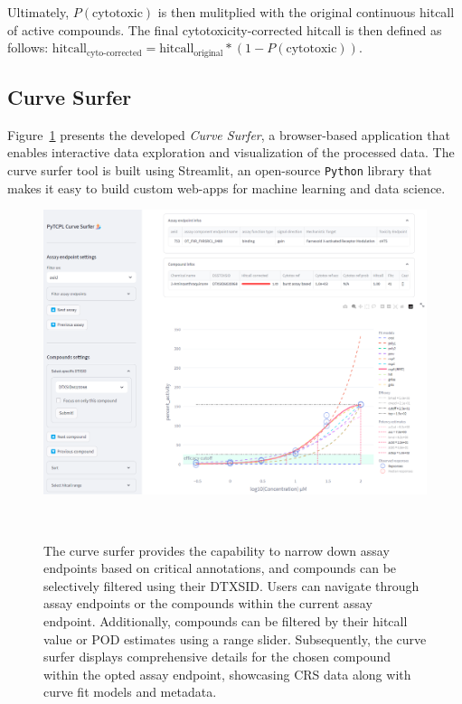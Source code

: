 Ultimately, $P(\text{cytotoxic})$ is then mulitplied with the original continuous hitcall of active compounds. The final cytotoxicity-corrected hitcall is then defined as follows: $\text{hitcall}_{\text{cyto-corrected}} = \text{hitcall}_{\text{original}} * (1 - P(\text{cytotoxic}))$.

\subsection{Curve Surfer}
Figure~\ref{fig:curve_surfer} presents the developed \emph{Curve Surfer}, a browser-based application that enables interactive data exploration and visualization of the processed data. The curve surfer tool is built using Streamlit, an open-source \texttt{Python} library that makes it easy to build custom web-apps for machine learning and data science. 

\begin{figure}  %
    \centering
    \includegraphics[width=1.0\textwidth]{figures/curve_surfer.png}
    \caption{The curve surfer provides the capability to narrow down assay endpoints based on critical annotations, and compounds can be selectively filtered using their DTXSID. Users can navigate through assay endpoints or the compounds within the current assay endpoint. Additionally, compounds can be filtered by their hitcall value or POD estimates using a range slider. Subsequently, the curve surfer displays comprehensive details for the chosen compound within the opted assay endpoint, showcasing CRS data along with curve fit models and metadata.}
~\label{fig:curve_surfer}
\end{figure}


